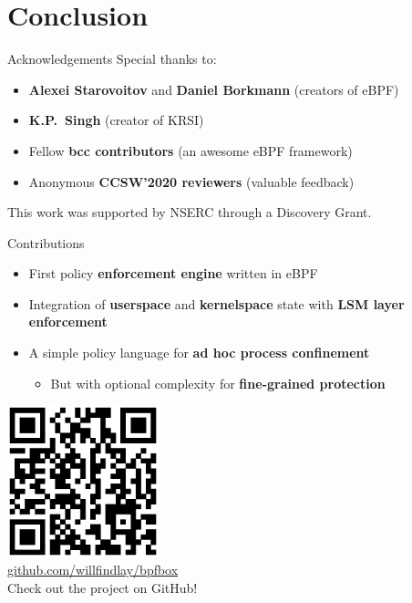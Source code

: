 \documentclass[12pt, dvipsnames]{beamer}
\begin{document}
\section{Conclusion}

\begin{frame}[c]{Acknowledgements}
Special thanks to:
\begin{itemize}
    \item \textbf{Alexei Starovoitov} and \textbf{Daniel Borkmann} (creators of eBPF)
    \item \textbf{K.P.~Singh} (creator of KRSI)
    \item Fellow \textbf{bcc contributors} (an awesome eBPF framework)
    \item Anonymous \textbf{CCSW'2020 reviewers} (valuable feedback)
\end{itemize}
\vfill
This work was supported by NSERC through a Discovery Grant.
\end{frame}

\begin{frame}[c]{Contributions}
\begin{itemize}
    \item First policy \textbf{enforcement engine} written in eBPF
    \item Integration of \textbf{userspace} and \textbf{kernelspace} state with \textbf{LSM layer enforcement}
    \item A simple policy language for \textbf{ad hoc process confinement}
    \begin{itemize}
        \item But with optional complexity for \textbf{fine-grained protection}
    \end{itemize}
\end{itemize}
\begin{center}
    \includegraphics[width=0.33\textwidth]{figs/bpfbox-qrcode.eps}\\
    \href{https://github.com/willfindlay/bpfbox}{\ttfamily github.com/willfindlay/bpfbox}\\
    Check out the project on GitHub!
\end{center}
\end{frame}
\end{document}
